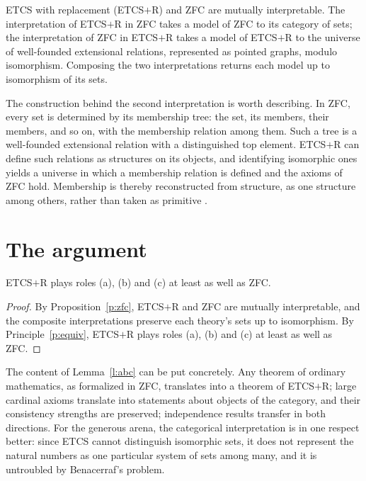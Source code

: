 \documentclass{situationist-preprint}
\begin{document}
\begin{proposition}\label{p:zfc}
ETCS with replacement (ETCS$+$R) and ZFC are mutually interpretable. The interpretation of ETCS$+$R in ZFC takes a model of ZFC to its category of sets; the interpretation of ZFC in ETCS$+$R takes a model of ETCS$+$R to the universe of well-founded extensional relations, represented as pointed graphs, modulo isomorphism. Composing the two interpretations returns each model up to isomorphism of its sets.
\end{proposition}

The construction behind the second interpretation is worth describing. In ZFC, every set is determined by its membership tree: the set, its members, their members, and so on, with the membership relation among them. Such a tree is a well-founded extensional relation with a distinguished top element. ETCS$+$R can define such relations as structures on its objects, and identifying isomorphic ones yields a universe in which a membership relation is defined and the axioms of ZFC hold. Membership is thereby reconstructed from structure, as one structure among others, rather than taken as primitive \citep{Shulman2019}.

\section{The argument}\label{s:argument}

\begin{lemma}\label{l:abc}
ETCS$+$R plays roles (a), (b) and (c) at least as well as ZFC.
\end{lemma}

\begin{proof}
By Proposition~\ref{p:zfc}, ETCS$+$R and ZFC are mutually interpretable, and the composite interpretations preserve each theory's sets up to isomorphism. By Principle~\ref{p:equiv}, ETCS$+$R plays roles (a), (b) and (c) at least as well as ZFC.
\end{proof}

The content of Lemma~\ref{l:abc} can be put concretely. Any theorem of ordinary mathematics, as formalized in ZFC, translates into a theorem of ETCS$+$R; large cardinal axioms translate into statements about objects of the category, and their consistency strengths are preserved; independence results transfer in both directions. For the generous arena, the categorical interpretation is in one respect better: since ETCS cannot distinguish isomorphic sets, it does not represent the natural numbers as one particular system of sets among many, and it is untroubled by Benacerraf's problem.
\end{document}
